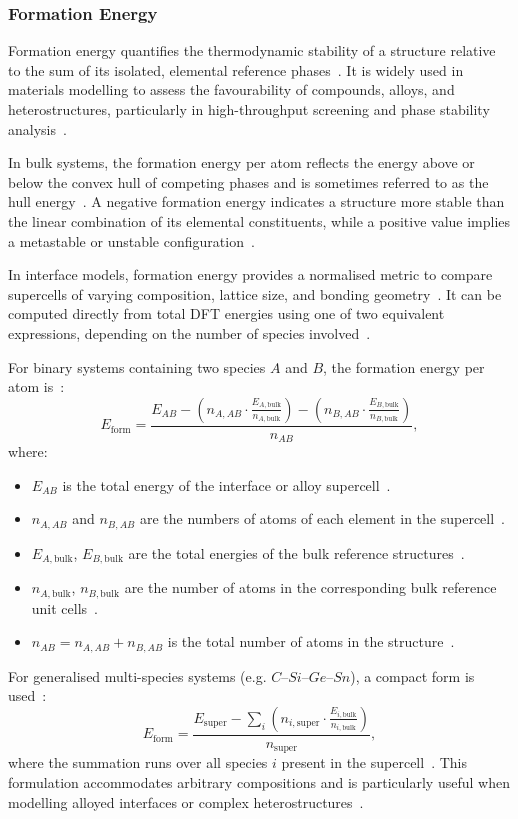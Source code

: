 \subsubsection*{Formation Energy}

Formation energy quantifies the thermodynamic stability of a structure relative to the sum of its isolated, elemental reference phases~\nocite{}.
It is widely used in materials modelling to assess the favourability of compounds, alloys, and heterostructures, particularly in high-throughput screening and phase stability analysis~\nocite{}.

In bulk systems, the formation energy per atom reflects the energy above or below the convex hull of competing phases and is sometimes referred to as the hull energy~\nocite{}.
A negative formation energy indicates a structure more stable than the linear combination of its elemental constituents, while a positive value implies a metastable or unstable configuration~\nocite{}.

In interface models, formation energy provides a normalised metric to compare supercells of varying composition, lattice size, and bonding geometry~\nocite{}.
It can be computed directly from total DFT energies using one of two equivalent expressions, depending on the number of species involved~\nocite{}.

For binary systems containing two species $A$ and $B$, the formation energy per atom is~\nocite{}:
\begin{equation}
    E_\mathrm{form} = \frac{E_{AB} - \left( n_{A,AB} \cdot \frac{E_{A,\mathrm{bulk}}}{n_{A,\mathrm{bulk}}} \right) - \left( n_{B,AB} \cdot \frac{E_{B,\mathrm{bulk}}}{n_{B,\mathrm{bulk}}} \right)}{n_{AB}},
\end{equation}
where:
\begin{itemize}
    \item $E_{AB}$ is the total energy of the interface or alloy supercell~\nocite{}.
    \item $n_{A,AB}$ and $n_{B,AB}$ are the numbers of atoms of each element in the supercell~\nocite{}.
    \item $E_{A,\mathrm{bulk}}$, $E_{B,\mathrm{bulk}}$ are the total energies of the bulk reference structures~\nocite{}.
    \item $n_{A,\mathrm{bulk}}$, $n_{B,\mathrm{bulk}}$ are the number of atoms in the corresponding bulk reference unit cells~\nocite{}.
    \item $n_{AB} = n_{A,AB} + n_{B,AB}$ is the total number of atoms in the structure~\nocite{}.
\end{itemize}
\newpage For generalised multi-species systems (e.g. $C$–$Si$–$Ge$–$Sn$), a compact form is used~\nocite{}:
\begin{equation}
    E_\mathrm{form} = \frac{E_\mathrm{super} - \sum_i \left( n_{i,\mathrm{super}} \cdot \frac{E_{i,\mathrm{bulk}}}{n_{i,\mathrm{bulk}}} \right)}{n_\mathrm{super}},
\end{equation}
where the summation runs over all species $i$ present in the supercell~\nocite{}.
This formulation accommodates arbitrary compositions and is particularly useful when modelling alloyed interfaces or complex heterostructures~\nocite{}.

